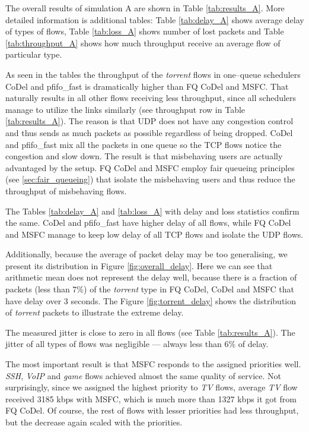 The overall results of simulation A are shown in Table \ref{tab:results_A}. More detailed information is additional tables: Table \ref{tab:delay_A} shows average delay of types of flows, Table \ref{tab:loss_A} shows number of lost packets and Table \ref{tab:throughput_A} shows how much throughput receive an average flow of particular type.

As seen in the tables the throughput of the \emph{torrent} flows in one--queue schedulers CoDel and pfifo\_fast is dramatically higher than FQ CoDel and MSFC. That naturally results in all other flows receiving less throughput, since all schedulers manage to utilize the links similarly (see throughput row in Table \ref{tab:results_A}). The reason is that UDP does not have any congestion control and thus sends as much packets as possible regardless of being dropped. CoDel and pfifo\_fast mix all the packets in one queue so the TCP flows notice the congestion and slow down. The result is that misbehaving users are actually advantaged by the setup. FQ CoDel and MSFC employ fair queueing principles (see \autoref{sec:fair_queueing}) that isolate the misbehaving users and thus reduce the throughput of misbehaving flows. 

The Tables \ref{tab:delay_A} and \ref{tab:loss_A} with delay and loss statistics confirm the same. CoDel and pfifo\_fast have higher delay of all flows, while FQ CoDel and MSFC manage to keep low delay of all TCP flows and isolate the UDP flows. 

Additionally, because the average of packet delay may be too generalising, we present its distribution in Figure \ref{fig:overall_delay}. Here we can see that arithmetic mean does not represent the delay well, because there is a fraction of packets (less than 7\%) of the \emph{torrent} type in FQ CoDel, CoDel and MSFC that have delay over 3 seconds. The Figure \ref{fig:torrent_delay} shows the distribution of \emph{torrent} packets to illustrate the extreme delay.

The measured jitter is close to zero in all flows (see Table \ref{tab:results_A}). The jitter of all types of flows was negligible --- always less than 6\% of delay.

The most important result is that MSFC responds to the assigned priorities well. \emph{SSH}, \emph{VoIP} and \emph{game} flows achieved almost the same quality of service. Not surprisingly, since we assigned the highest priority to \emph{TV} flows, average \emph{TV} flow received 3185 kbps with MSFC, which is much more than 1327 kbps it got from FQ CoDel. Of course, the rest of flows with lesser priorities had less throughput, but the decrease again scaled with the priorities.

